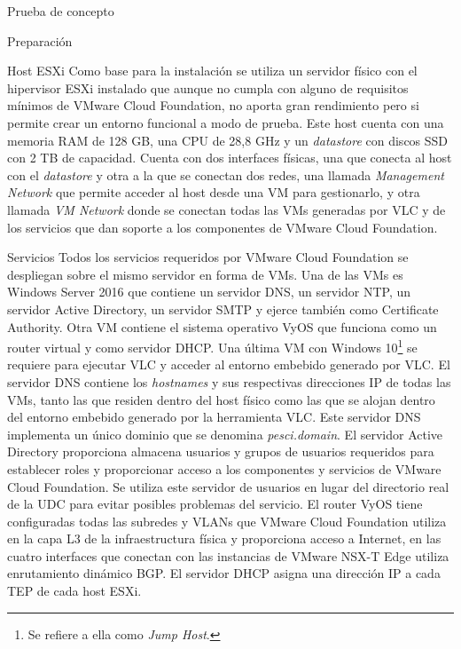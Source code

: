 \begin{section}{Prueba de concepto}
\begin{subsection}{Preparación}
\begin{subsubsection}{Host ESXi}
  Como base para la instalación se utiliza un servidor físico con el hipervisor ESXi instalado que aunque no cumpla con alguno de requisitos mínimos de VMware Cloud Foundation, no aporta gran rendimiento pero si permite crear un entorno funcional a modo de prueba. Este host cuenta con una memoria RAM de 128 GB, una CPU de 28,8 GHz y un \textit{datastore} con discos SSD con 2 TB de capacidad. Cuenta con dos interfaces físicas, una que conecta al host con el \textit{datastore} y otra a la que se conectan dos redes, una llamada \textit{Management Network} que permite acceder al host desde una VM para gestionarlo, y otra llamada \textit{VM Network} donde se conectan todas las VMs generadas por VLC y de los servicios que dan soporte a los componentes de VMware Cloud Foundation.
  \end{subsubsection}
  \begin{subsubsection}{Servicios}
    Todos los servicios requeridos por VMware Cloud Foundation se despliegan sobre el mismo servidor en forma de VMs. Una de las VMs es Windows Server 2016 que contiene un servidor DNS, un servidor NTP, un servidor Active Directory, un servidor SMTP y ejerce también como Certificate Authority. Otra VM contiene el sistema operativo VyOS que funciona como un router virtual y como servidor DHCP. Una última VM con Windows 10\footnote{Se refiere a ella como \textit{Jump Host}.} se requiere para ejecutar VLC y acceder al entorno embebido generado por VLC.
    El servidor DNS contiene los \textit{hostnames} y sus respectivas direcciones IP de todas las VMs, tanto las que residen dentro del host físico como las que se alojan dentro del entorno embebido generado por la herramienta VLC. Este servidor DNS implementa un único dominio que se denomina \textit{pesci.domain}. El servidor Active Directory proporciona almacena usuarios y grupos de usuarios requeridos para establecer roles y proporcionar acceso a los componentes y servicios de VMware Cloud Foundation. Se utiliza este servidor de usuarios en lugar del directorio real de la UDC para evitar posibles problemas del servicio. El router VyOS tiene configuradas todas las subredes y VLANs que VMware Cloud Foundation utiliza en la capa L3 de la infraestructura física y proporciona acceso a Internet, en las cuatro interfaces que conectan con las instancias de VMware NSX-T Edge utiliza enrutamiento dinámico BGP. El servidor DHCP asigna una dirección IP a cada TEP de cada host ESXi.    
  \end{subsubsection}
  

\end{subsection}
\end{section}
